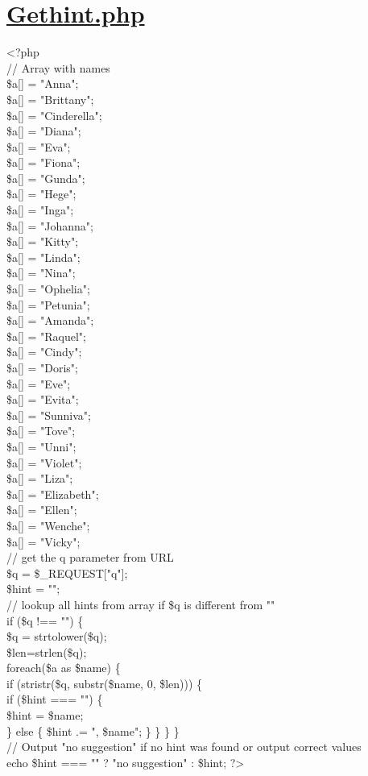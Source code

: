 \section*{\fontsize{16}{14}\selectfont \underline{Gethint.php}}
<?php\\
// Array with names\\
\$a[] = "Anna";\\
\$a[] = "Brittany";\\
\$a[] = "Cinderella";\\
\$a[] = "Diana";\\
\$a[] = "Eva";\\
\$a[] = "Fiona";\\
\$a[] = "Gunda";\\
\$a[] = "Hege";\\
\$a[] = "Inga";\\
\$a[] = "Johanna";\\
\$a[] = "Kitty";\\
\$a[] = "Linda";\\
\$a[] = "Nina";\\
\$a[] = "Ophelia";\\
\$a[] = "Petunia";\\
\$a[] = "Amanda";\\
\$a[] = "Raquel";\\
\$a[] = "Cindy";\\
\$a[] = "Doris";\\
\$a[] = "Eve";\\
\$a[] = "Evita";\\
\$a[] = "Sunniva";\\
\$a[] = "Tove";\\
\$a[] = "Unni";\\
\$a[] = "Violet";\\
\$a[] = "Liza";\\
\$a[] = "Elizabeth";\\
\$a[] = "Ellen";\\
\$a[] = "Wenche";\\
\$a[] = "Vicky";\\
// get the q parameter from URL\\
\$q = \$\_REQUEST["q"];\\
\$hint = "";\\
// lookup all hints from array if \$q is different from "" \\
if (\$q !== "") \{\\
    \$q = strtolower(\$q);\\
    \$len=strlen(\$q);\\
    foreach(\$a as \$name) \{\\
        if (stristr(\$q, substr(\$name, 0, \$len))) \{\\
            if (\$hint === "") \{ \\
                \$hint = \$name; \\
            \} else \{
                \$hint .= ", \$name"; \} \} \} \}\\
// Output "no suggestion" if no hint was found or output correct values \\
echo \$hint === "" ? "no suggestion" : \$hint; ?>

